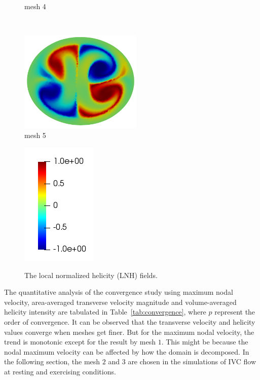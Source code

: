 \begin{figure}[htbp]
\begin{minipage}[c][2in][c]{0.4\linewidth}
        mesh 4
    \end{minipage}\\[.5\baselineskip]
    \begin{minipage}[c][2in][c]{0.4\linewidth}
        \centering
        \includegraphics[width=2.3in]{imgs/vena_cava/LNH_mesh5.png}\\
        mesh 5
    \end{minipage}
    \begin{minipage}[c][2in][c]{0.4\linewidth}
        \centering
        \includegraphics[width=.7in]{imgs/vena_cava/colormap_LNH.png}\\
    \end{minipage}
    \caption{The local normalized helicity (LNH) fields.}
    \label{fig:lnh}
\end{figure}

The quantitative analysis of the convergence study using maximum nodal velocity, area-averaged transverse velocity magnitude and volume-averaged helicity intensity are tabulated in Table~\ref{tab:convergence}, where $p$ represent the order of convergence.
It can be observed that the transverse velocity and helicity values converge when meshes get finer. But for the maximum nodal velocity, the trend is monotonic except for the result by mesh $1$. This might be because the nodal maximum velocity can be affected by how the domain is decomposed. In the following section, the mesh $2$ and $3$ are chosen in the simulations of IVC flow at resting and exercising conditions.

